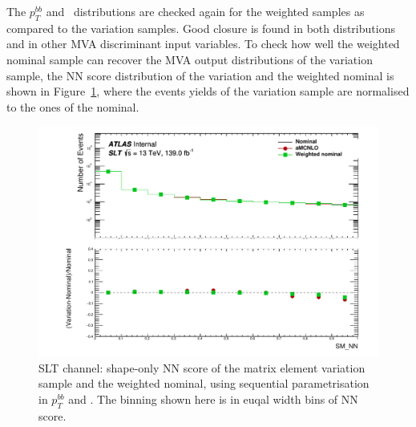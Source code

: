 The $p_T^{bb}$ and \met\ distributions are checked again for the 
weighted samples as compared to the variation samples. 
Good closure is found in both distributions and in other MVA discriminant
input variables. 
To check how well the weighted nominal sample can recover the MVA output distributions
of the variation sample, the NN score distribution of the variation 
and the weighted nominal is shown in Figure~\ref{fig:ttbarsyst_lephad_amc_NN},
where the events yields of the variation sample are 
normalised to the ones of the nominal.

\begin{figure}
\centering
\includegraphics[width=.49\textwidth]{ figures/lephad_modelling_systs/SLT/aMCNLO/Hist_and_ratio_SM_NN_Norm.pdf}
\caption{SLT channel: shape-only NN score of the matrix element variation sample and the weighted nominal, using sequential parametrisation
in $p_T^{bb}$ and \met.
The binning shown here is in euqal width bins of NN score. }
\label{fig:ttbarsyst_lephad_amc_NN}
\end{figure}
  
